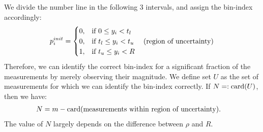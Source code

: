 %			
We divide the number line in the following $3$ intervals, and assign the bin-index accordingly:
\begin{equation}
{p}^{init}_{i} = 
\begin{cases}
0,& \text{if } 0\leq y_i < t_l \\
0,& \text{if } t_l\leq y_i < t_u ~~~~ \textnormal{(region of uncertainty)} \\
1,& \text{if } t_u \leq y_i < R \\
\end{cases}
\label{eq:rcm}
\end{equation}
Therefore, we can identify the correct bin-index for a significant fraction of the measurements by merely observing their magnitude. We define set $U$ as the set of measurements for which we can identify the bin-index correctly. If $N=: \mathrm{card}(U)$, then we have:
\begin{align*}
N & =  m - \mathrm{card}(\textnormal{measurements within region of uncertainty}).
\end{align*}
The value of $N$ largely depends on the difference between $\rho$ and $R$.

